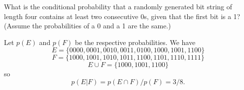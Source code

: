 \documentclass[../main.tex]{subfiles}
\begin{document}
What is the conditional probability that a randomly generated bit string of length four contains at least two consecutive 0s, given that the first bit is a 1?
(Assume the probabilities of a 0 and a 1 are the same.)

\solution
Let $p(E)$ and $p(F)$ be the respective probabilities.
We have
\[
	E = \{0000, 0001, 0010, 0011, 0100, 1000, 1001, 1100\}
\]
\[
	F = \{1000, 1001, 1010, 1011, 1100, 1101, 1110, 1111\}
\]
\[
	E \cup F = \{1000, 1001, 1100\}
\]
so
\[
p(E|F) = p(E \cap F)/p(F) = 3/8.
\]
\end{document}
